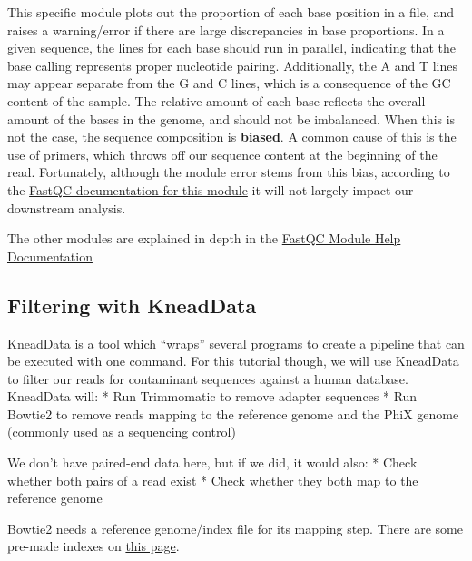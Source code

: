 \documentclass[
]{book}
\begin{document}
This specific module plots out the proportion of each base position in a file, and raises a warning/error if there are large discrepancies in base proportions. In a given sequence, the lines for each base should run in parallel, indicating that the base calling represents proper nucleotide pairing. Additionally, the A and T lines may appear separate from the G and C lines, which is a consequence of the GC content of the sample. The relative amount of each base reflects the overall amount of the bases in the genome, and should not be imbalanced. When this is not the case, the sequence composition is \textbf{biased}. A common cause of this is the use of primers, which throws off our sequence content at the beginning of the read. Fortunately, although the module error stems from this bias, according to the \href{https://www.bioinformatics.babraham.ac.uk/projects/fastqc/Help/3\%20Analysis\%20Modules/4\%20Per\%20Base\%20Sequence\%20Content.html\#:~:text=Whilst\%20this\%20is\%20a\%20true\%20technical\%20bias\%2C\%20it\%20isn\%27t\%20something\%20which\%20can\%20be\%20corrected\%20by\%20trimming\%20and\%20in\%20most\%20cases\%20doesn\%27t\%20seem\%20to\%20adversely\%20affect\%20the\%20downstream\%20analysis.}{FastQC documentation for this module} it will not largely impact our downstream analysis.

The other modules are explained in depth in the \href{https://www.bioinformatics.babraham.ac.uk/projects/fastqc/Help/3\%20Analysis\%20Modules/}{FastQC Module Help Documentation}

\subsection{Filtering with KneadData}\label{filtering-with-kneaddata}

KneadData is a tool which ``wraps'' several programs to create a pipeline that can be executed with one command. For this tutorial though, we will use KneadData to filter our reads for contaminant sequences against a human database. KneadData will:
* Run Trimmomatic to remove adapter sequences
* Run Bowtie2 to remove reads mapping to the reference genome and the PhiX genome (commonly used as a sequencing control)

We don't have paired-end data here, but if we did, it would also:
* Check whether both pairs of a read exist
* Check whether they both map to the reference genome

Bowtie2 needs a reference genome/index file for its mapping step. There are some pre-made indexes on \href{https://benlangmead.github.io/aws-indexes/bowtie}{this page}.
\end{document}
